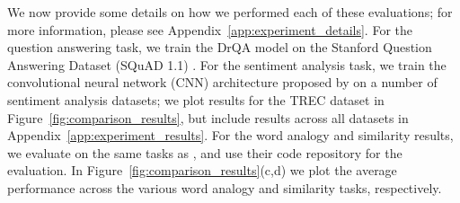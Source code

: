 We now provide some details on how we performed each of these evaluations; for more information, please see Appendix~\ref{app:experiment_details}.
For the question answering task, we train the DrQA model \citep{drqa17} on the Stanford Question Answering Dataset (SQuAD 1.1) \citep{squad16}.
For the sentiment analysis task, we train the convolutional neural network (CNN) architecture proposed by \citet{kim14} on a number of sentiment analysis datasets; we plot results for the TREC dataset in Figure~\ref{fig:comparison_results}, but include results across all datasets in Appendix~\ref{app:experiment_results}.
For the word analogy and similarity results, we evaluate on the same tasks as \citet{levy15}, and use their code repository for the evaluation.
In Figure~\ref{fig:comparison_results}(c,d) we plot the average performance across the various word analogy and similarity tasks, respectively.



